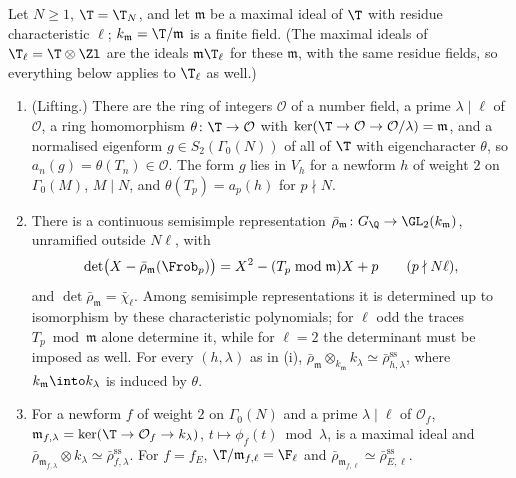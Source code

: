 \begin{proposition}\label{prop:modgalrep:rhobar-m}
Let $N\ge1$, $\T=\T_N$, and let $\mathfrak m$ be a maximal ideal of $\T$ with residue characteristic $\ell$; $k_{\mathfrak m}=\T/\mathfrak m$ is a finite field. (The maximal ideals of
$\T_\ell=\T\otimes\Zl$ are the ideals $\mathfrak m\T_\ell$ for these $\mathfrak m$, with the same residue fields, so everything below applies to $\T_\ell$ as well.)
\begin{enumerate}[label=(\roman*)]
\item (Lifting.) There are the ring of integers $\mathcal{O}$ of a number field, a prime $\lambda\mid\ell$ of $\mathcal{O}$, a ring homomorphism $\theta\colon\T\to\mathcal{O}$ with
$\ker(\T\to\mathcal{O}\to\mathcal{O}/\lambda)=\mathfrak m$, and a normalised eigenform $g\in S_2(\Gamma_0(N))$ of all of $\T$ with eigencharacter $\theta$, so $a_n(g)=\theta(T_n)\in\mathcal{O}$. The form $g$ lies in
$V_h$ for a newform $h$ of weight $2$ on $\Gamma_0(M)$, $M\mid N$, and $\theta(T_p)=a_p(h)$ for $p\nmid N$.
\item There is a continuous semisimple representation $\bar\rho_{\mathfrak m}\colon G_\Q\to\GL_2(k_{\mathfrak m})$, unramified outside $N\ell$, with
\[
\det\bigl(X-\bar\rho_{\mathfrak m}(\Frob_p)\bigr)=X^2-(T_p\bmod\mathfrak m)X+p\qquad(p\nmid N\ell),
\]
and $\det\bar\rho_{\mathfrak m}=\bar\chi_\ell$. Among semisimple representations it is determined up to isomorphism by these characteristic polynomials; for $\ell$ odd the traces
$T_p\bmod\mathfrak m$ alone determine it, while for $\ell=2$ the determinant must be imposed as well. For every $(h,\lambda)$ as in (i),
$\bar\rho_{\mathfrak m}\otimes_{k_{\mathfrak m}}k_\lambda\simeq\bar\rho_{h,\lambda}^{\mathrm{ss}}$, where $k_{\mathfrak m}\into k_\lambda$ is induced by $\theta$.
\item For a newform $f$ of weight $2$ on $\Gamma_0(N)$ and a prime $\lambda\mid\ell$ of $\mathcal{O}_f$, $\mathfrak m_{f,\lambda}=\ker(\T\to\mathcal{O}_f\to k_\lambda)$, $t\mapsto\phi_f(t)\bmod\lambda$, is a
maximal ideal and $\bar\rho_{\mathfrak m_{f,\lambda}}\otimes k_\lambda\simeq\bar\rho_{f,\lambda}^{\mathrm{ss}}$. For $f=f_E$, $\T/\mathfrak m_{f,\ell}=\F_\ell$ and $\bar\rho_{\mathfrak m_{f,\ell}}\simeq\bar\rho_{E,\ell}^{\mathrm{ss}}$.
\end{enumerate}
\end{proposition}

